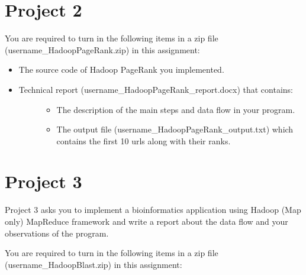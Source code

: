 
\chapter{Project 2}\label{project-2}

You are required to turn in the following items in a zip file
(username\_HadoopPageRank.zip) in this assignment:

\begin{itemize}
\item
  The source code of Hadoop PageRank you implemented.
\item
  \begin{description}
  \item[Technical report (username\_HadoopPageRank\_report.docx) that
  contains:]
  \begin{itemize}
  \tightlist
  \item
    The description of the main steps and data flow in your program.
  \item
    The output file (username\_HadoopPageRank\_output.txt) which
    contains the first 10 urls along with their ranks.
  \end{itemize}
  \end{description}
\end{itemize}



\chapter{Project 3}\label{project-3}

Project 3 asks you to implement a bioinformatics application using
Hadoop (Map only) MapReduce framework and write a report about the data
flow and your observations of the program.

You are required to turn in the following items in a zip file
(username\_HadoopBlast.zip) in this assignment:

